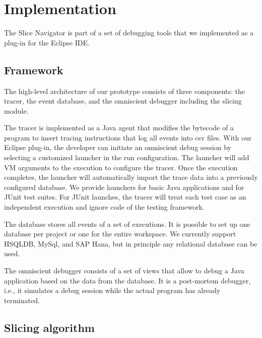 ﻿\documentclass[
      english,
			conference,
      ]{IEEEtran}
\newcommand{\todo}[2][]{\pdfmargincomment[color=orange,icon=Note,subject={TODO},author={#1}]{#2}}
\begin{document}
\todo{move this to evaluation}

\section{Implementation}
\label{sec:impl}

The Slice Navigator is part of a set of debugging tools that we implemented as a plug-in for the Eclipse IDE.

\subsection{Framework}

The high-level architecture of our prototype consists of three components: the tracer, the event database, and the omniscient debugger including the slicing module.

The tracer is implemented as a Java agent that modifies the bytecode of a program to insert tracing instructions that log all events into csv files.
With our Eclipse plug-in, the developer can initiate an omniscient debug session by selecting a customized launcher in the run configuration.
The launcher will add VM arguments to the execution to configure the tracer.
Once the execution completes, the launcher will automatically import the trace data into a previously configured database.
We provide launchers for basic Java applications and for JUnit test suites.
For JUnit launches, the tracer will treat each test case as an independent execution and ignore code of the testing framework.

The database stores all events of a set of executions.
It is possible to set up one database per project or one for the entire workspace.
We currently support HSQLDB, MySql, and SAP Hana, but in principle any relational database can be used.

The omniscient debugger consists of a set of views that allow to debug a Java application based on the data from the database.
It is a post-mortem debugger, i.e., it simulates a debug session while the actual program has already terminated.

\subsection{Slicing algorithm}
\end{document}
